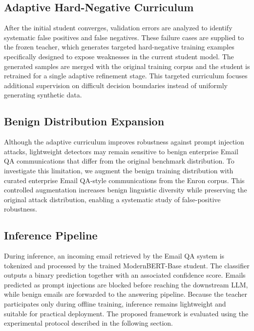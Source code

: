 \documentclass[conference]{IEEEtran}
\begin{document}
\subsection{Adaptive Hard-Negative Curriculum}

After the initial student converges, validation errors are analyzed to identify systematic false positives and false negatives. These failure cases are supplied to the frozen teacher, which generates targeted hard-negative training examples specifically designed to expose weaknesses in the current student model. The generated samples are merged with the original training corpus and the student is retrained for a single adaptive refinement stage. This targeted curriculum focuses additional supervision on difficult decision boundaries instead of uniformly generating synthetic data.

\subsection{Benign Distribution Expansion}

Although the adaptive curriculum improves robustness against prompt injection attacks, lightweight detectors may remain sensitive to benign enterprise Email QA communications that differ from the original benchmark distribution. To investigate this limitation, we augment the benign training distribution with curated enterprise Email QA-style communications from the Enron corpus. This controlled augmentation increases benign linguistic diversity while preserving the original attack distribution, enabling a systematic study of false-positive robustness.

\subsection{Inference Pipeline}

During inference, an incoming email retrieved by the Email QA system is tokenized and processed by the trained ModernBERT-Base student. The classifier outputs a binary prediction together with an associated confidence score. Emails predicted as prompt injections are blocked before reaching the downstream LLM, while benign emails are forwarded to the answering pipeline. Because the teacher participates only during offline training, inference remains lightweight and suitable for practical deployment. The proposed framework is evaluated using the experimental protocol described in the following section.
\end{document}
